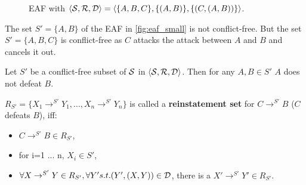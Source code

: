 \begin{figure}[h]
\centering
{}
\caption{\gls{EAF} with $\langle \S, \R, \D \rangle = \langle \{A, B, C\}, \{(A, B)\}, \{(C, (A, B))\} \rangle$.}
\label{fig:eaf_small}
\end{figure}

\begin{exa}
	The set $S' = \{A, B\}$ of the \gls{EAF} in \autoref{fig:eaf_small} is not conflict-free. But the set $S' = \{A, B, C\}$ is conflict-free as $C$ attacks the attack between $A$ and $B$ and cancels it out.
\end{exa}

\begin{lemma}
Let $S'$ be a conflict-free subset of $\S$ in $\langle \S, \R, \D \rangle$. Then for any $A, B \in S'$ $A$ does not defeat $B$.
\end{lemma}

\begin{definition}
$R_{S'} = \{X_1 \rightarrow^{S'} Y_1, ..., 	X_n \rightarrow^{S'} Y_n\}$ is called a \textbf{reinstatement set} for $C \rightarrow^{S'} B$ ($C$ defeats $B$), iff:
\begin{itemize}
	\item $C \rightarrow^{S'} B \in R_{S'}$,
	\item for i=1 ... n, $X_i \in S'$,
	\item $\forall X \rightarrow^{S'} Y \in R_{S'}, \forall Y' s.t. (Y', (X, Y))\in \D$, there is a $X' \rightarrow^{S'} Y' \in R_{S'}$.
\end{itemize}
\end{definition}


